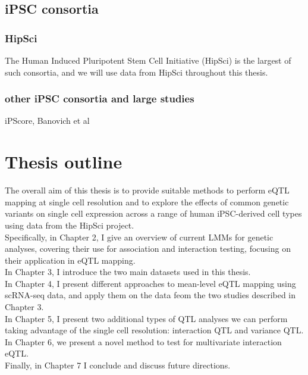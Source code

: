 
\subsection{iPSC consortia}

\subsubsection{HipSci}
The Human Induced Pluripotent Stem Cell Initiative (HipSci) is the largest of such consortia, and we will use data from HipSci throughout this thesis.

\subsubsection{other iPSC consortia and large studies}

iPScore, Banovich et al

\section{Thesis outline}

The overall aim of this thesis is to provide suitable methods to perform eQTL mapping at single cell resolution and to explore the effects of common genetic variants on single cell expression across a range of human iPSC-derived cell types using data from the HipSci project.\\

Specifically, in Chapter 2, I give an overview of current LMMs for genetic analyses, covering their use for association and interaction testing, focusing on their application in eQTL mapping.\\

In Chapter 3, I introduce the two main datasets used in this thesis. \\

In Chapter 4, I present different approaches to mean-level eQTL mapping using scRNA-seq data, and apply them on the data feom the two studies described in Chapter 3. \\

In Chapter 5, I present two additional types of QTL analyses we can perform taking advantage of the single cell resolution: interaction QTL and variance QTL. \\

In Chapter 6, we present a novel method to test for multivariate interaction eQTL. \\

Finally, in Chapter 7 I conclude and discuss future directions.